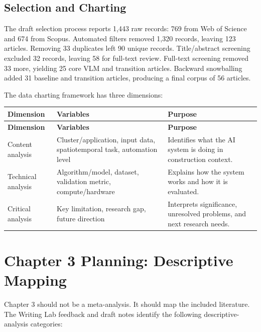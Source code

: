 \documentclass[10pt,letterpaper]{article}
\begin{document}
\subsection{Selection and Charting}

The draft selection process reports 1,443 raw records: 769 from Web of Science and 674 from Scopus. Automated filters removed 1,320 records, leaving 123 articles. Removing 33 duplicates left 90 unique records. Title/abstract screening excluded 32 records, leaving 58 for full-text review. Full-text screening removed 33 more, yielding 25 core VLM and transition articles. Backward snowballing added 31 baseline and transition articles, producing a final corpus of 56 articles.

The data charting framework has three dimensions:

\begin{longtable}{L{3.0cm} L{4.7cm} L{6.0cm}}
\toprule
{}
\textbf{Dimension} & \textbf{Variables} & \textbf{Purpose}\\
\midrule
\endfirsthead
\toprule
{}
\textbf{Dimension} & \textbf{Variables} & \textbf{Purpose}\\
\midrule
\endhead
\bottomrule
\endfoot
Content analysis & Cluster/application, input data, spatiotemporal task, automation level & Identifies what the AI system is doing in construction context.\\
Technical analysis & Algorithm/model, dataset, validation metric, compute/hardware & Explains how the system works and how it is evaluated.\\
Critical analysis & Key limitation, research gap, future direction & Interprets significance, unresolved problems, and next research needs.\\
\end{longtable}

\section{Chapter 3 Planning: Descriptive Mapping}

Chapter 3 should not be a meta-analysis. It should map the included literature. The Writing Lab feedback and draft notes identify the following descriptive-analysis categories:
\end{document}
